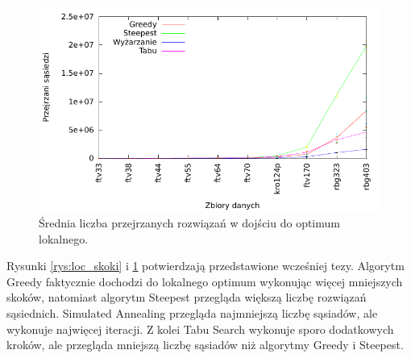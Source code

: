 \begin{figure}[!h]
\centering\includegraphics[width=12cm]{img/loc_sasiedzi}
\caption{Średnia liczba przejrzanych rozwiązań w dojściu do optimum lokalnego.}\label{rys:loc_sasiedzi}
\end{figure}

Rysunki \ref{rys:loc_skoki} i \ref{rys:loc_sasiedzi} potwierdzają przedstawione wcześniej tezy. Algorytm Greedy faktycznie dochodzi do lokalnego optimum wykonując więcej mniejszych skoków, natomiast algorytm Steepest przegląda większą liczbę rozwiązań sąsiednich. Simulated Annealing przegląda najmniejszą liczbę sąsiadów, ale wykonuje najwięcej iteracji. Z kolei Tabu Search wykonuje sporo dodatkowych kroków, ale przegląda mniejszą liczbę sąsiadów niż algorytmy Greedy i Steepest.